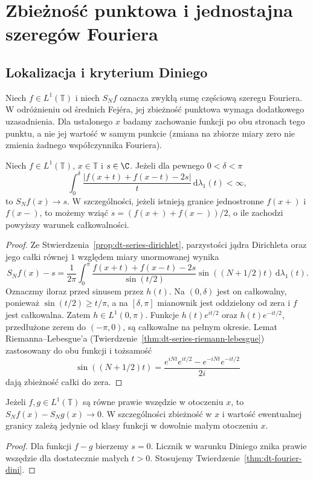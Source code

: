 \section{Zbieżność punktowa i jednostajna szeregów Fouriera}
\providecommand{\atlasref}[2]{#2}

\subsection{Lokalizacja i kryterium Diniego}

Niech $f\in L^1(\mathbb T)$ i niech $S_Nf$
oznacza zwykłą sumę częściową szeregu Fouriera.
W odróżnieniu od średnich Fejéra, jej zbieżność
punktowa wymaga dodatkowego uzasadnienia.
Dla ustalonego $x$ badamy zachowanie funkcji
po obu stronach tego punktu, a nie jej wartość
w samym punkcie (zmiana na zbiorze miary zero
nie zmienia żadnego współczynnika Fouriera).

\begin{twierdzenie}
\label{thm:dt-fourier-dini}
Niech $f\in L^1(\mathbb T)$, $x\in\mathbb T$
i $s\in\C$. Jeżeli dla pewnego $0<\delta<\pi$
\[
 \int_0^\delta
 \frac{|f(x+t)+f(x-t)-2s|}{t}
 \,\mathrm d\lambda_1(t)<\infty,
\]
to $S_Nf(x)\to s$.
W szczególności, jeżeli istnieją granice jednostronne
$f(x+)$ i $f(x-)$, to możemy wziąć
$s=(f(x+)+f(x-))/2$, o ile zachodzi powyższy
warunek całkowalności.
\end{twierdzenie}
\begin{proof}
Ze Stwierdzenia~\ref{prop:dt-series-dirichlet},
parzystości jądra Dirichleta oraz jego całki
równej $1$ względem miary unormowanej wynika
\[
 S_Nf(x)-s=\frac1{2\pi}\int_0^\pi
 \frac{f(x+t)+f(x-t)-2s}{\sin(t/2)}
 \sin((N+1/2)t)\,\mathrm d\lambda_1(t).
\]
Oznaczmy iloraz przed sinusem przez $h(t)$.
Na $(0,\delta)$ jest on całkowalny, ponieważ
$\sin(t/2)\ge t/\pi$, a na $[\delta,\pi]$
mianownik jest oddzielony od zera i $f$ jest
całkowalna. Zatem $h\in L^1(0,\pi)$.
Funkcje $h(t)e^{it/2}$ oraz $h(t)e^{-it/2}$,
przedłużone zerem do $(-\pi,0)$, są całkowalne
na pełnym okresie. Lemat Riemanna--Lebesgue'a
(Twierdzenie~\ref{thm:dt-series-riemann-lebesgue})
zastosowany do obu funkcji i tożsamość
\[
 \sin((N+1/2)t)=
 \frac{e^{iNt}e^{it/2}-e^{-iNt}e^{-it/2}}{2i}
\]
dają zbieżność całki do zera.
\end{proof}

\begin{wniosek}
\label{cor:dt-fourier-localization}
Jeżeli $f,g\in L^1(\mathbb T)$ są równe
prawie wszędzie w otoczeniu $x$, to
$S_Nf(x)-S_Ng(x)\to0$.
W szczególności zbieżność w $x$ i wartość
ewentualnej granicy zależą jedynie od klasy
funkcji w dowolnie małym otoczeniu $x$.
\end{wniosek}
\begin{proof}
Dla funkcji $f-g$ bierzemy $s=0$.
Licznik w warunku Diniego znika prawie wszędzie
dla dostatecznie małych $t>0$.
Stosujemy Twierdzenie~\ref{thm:dt-fourier-dini}.
\end{proof}

